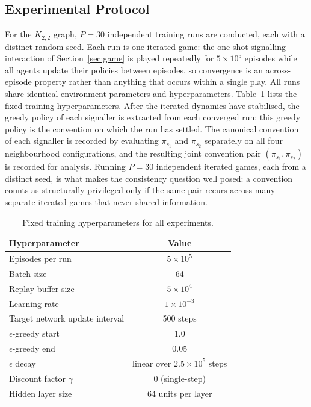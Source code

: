 \documentclass[a4paper,twoside,12pt]{report}
\begin{document}
    \subsection{Experimental Protocol}
    
    For the $K_{2,2}$ graph, $P = 30$ independent training runs are conducted,
    each with a distinct random seed. Each run is one iterated game: the one-shot
    signalling interaction of Section~\ref{sec:game} is played repeatedly for
    $5 \times 10^5$ episodes while all agents update their policies between
    episodes, so convergence is an across-episode property rather than anything
    that occurs within a single play. All runs share identical environment
    parameters and hyperparameters. Table~\ref{tab:hyperparams} lists the fixed
    training hyperparameters. After the iterated dynamics have stabilised, the
    greedy policy of each signaller is extracted from each converged run; this
    greedy policy is the convention on which the run has settled. The canonical
    convention of each signaller is recorded by evaluating $\pi_{s_1}$ and
    $\pi_{s_2}$ separately on all four neighbourhood configurations, and the
    resulting joint convention pair $(\pi_{s_1}, \pi_{s_2})$ is recorded for
    analysis. Running $P = 30$ independent iterated games, each from a distinct
    seed, is what makes the consistency question well posed: a convention counts
    as structurally privileged only if the same pair recurs across many separate
    iterated games that never shared information.
    
    \begin{table}[h]
    \centering
    \caption{Fixed training hyperparameters for all experiments.}
    \label{tab:hyperparams}
    \begin{tabular}{lc}
    \toprule
    \textbf{Hyperparameter} & \textbf{Value} \\
    \midrule
    Episodes per run               & $5 \times 10^5$         \\
    Batch size                     & 64                      \\
    Replay buffer size             & $5 \times 10^4$         \\
    Learning rate                  & $1 \times 10^{-3}$      \\
    Target network update interval & 500 steps               \\
    $\epsilon$-greedy start        & 1.0                     \\
    $\epsilon$-greedy end          & 0.05                    \\
    $\epsilon$ decay               & linear over $2.5 \times 10^5$ steps \\
    Discount factor $\gamma$       & 0 \quad (single-step)   \\
    Hidden layer size              & 64 units per layer      \\
    \bottomrule
    \end{tabular}
    \end{table}
    
\end{document}
